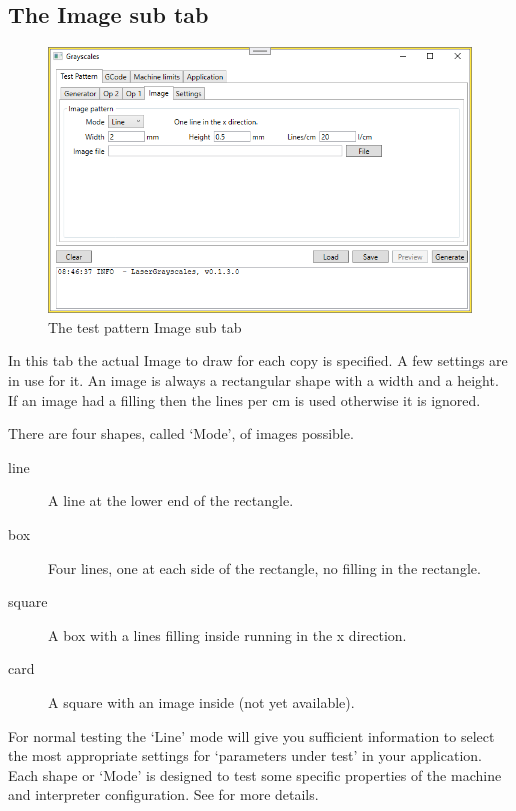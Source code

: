 \subsection{The Image sub tab}\label{TestPatternImageTab}
\begin{figure}[h!]
    \centering
    \includegraphics[width=0.8\linewidth]{./images/Image.png}
    \caption{The test pattern Image sub tab}
\end{figure}

In this tab the actual Image to draw for each copy is specified. A few settings are in use for it. An image is always a rectangular shape with a width and a height.
If an image had a filling then the lines per cm is used otherwise it is ignored.

There are four shapes, called `Mode', of images possible.
\begin{description}
    \item[line]   A line at the lower end of the rectangle.
    \item[box]    Four lines, one at each side of the rectangle, no filling in the rectangle.
    \item[square] A box with a lines filling inside running in the x direction.
    \item[card]   A square with an image inside (not yet available).
\end{description}

For normal testing the `Line' mode will give you sufficient information to select the most appropriate settings for `parameters under test' in your application.
Each shape or `Mode' is designed to test some specific properties of the machine and interpreter configuration. See  for more details.

